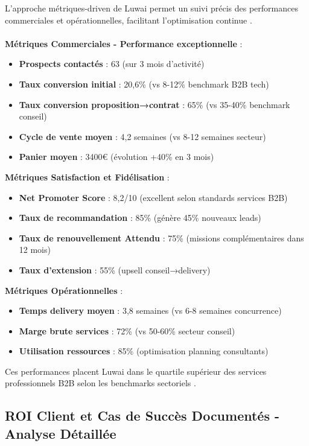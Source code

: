 L'approche métriques-driven de Luwai permet un suivi précis des performances commerciales et opérationnelles, facilitant l'optimisation continue \cite{luwai2025kpis}.
\\\\
\textbf{Métriques Commerciales - Performance exceptionnelle} :
\begin{itemize}
    \item \textbf{Prospects contactés} : 63 (sur 3 mois d'activité)
    \item \textbf{Taux conversion initial} : 20,6\% (vs 8-12\% benchmark B2B tech)
    \item \textbf{Taux conversion proposition→contrat} : 65\% (vs 35-40\% benchmark conseil)
    \item \textbf{Cycle de vente moyen} : 4,2 semaines (vs 8-12 semaines secteur)
    \item \textbf{Panier moyen} : 3400€ (évolution +40\% en 3 mois)
\end{itemize}
\medskip
\textbf{Métriques Satisfaction et Fidélisation} :
\begin{itemize}
    \item \textbf{Net Promoter Score} : 8,2/10 (excellent selon standards services B2B)
    \item \textbf{Taux de recommandation} : 85\% (génère 45\% nouveaux leads)
    \item \textbf{Taux de renouvellement Attendu} : 75\% (missions complémentaires dans 12 mois)
    \item \textbf{Taux d'extension} : 55\% (upsell conseil→delivery)
\end{itemize}
\medskip
\textbf{Métriques Opérationnelles} :
\begin{itemize}
    \item \textbf{Temps delivery moyen} : 3,8 semaines (vs 6-8 semaines concurrence)
    \item \textbf{Marge brute services} : 72\% (vs 50-60\% secteur conseil)
    \item \textbf{Utilisation ressources} : 85\% (optimisation planning consultants)
\end{itemize}
\medskip
Ces performances placent Luwai dans le quartile supérieur des services professionnels B2B selon les benchmarks sectoriels \cite{professional_services2024benchmarks}.

\subsection{ROI Client et Cas de Succès Documentés - Analyse Détaillée}

